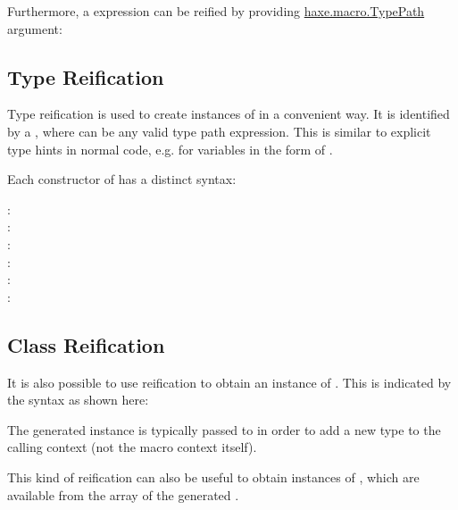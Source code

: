 Furthermore, a  expression can be reified by providing \href{http://api.haxe.org/haxe/macro/TypePath.html}{haxe.macro.TypePath} argument: 

\subsection{Type Reification}
\label{macro-reification-type}

Type reification is used to create instances of  in a convenient way. It is identified by a , where  can be any valid type path expression. This is similar to explicit type hints in normal code, e.g. for variables in the form of .

Each constructor of  has a distinct syntax:

\begin{description}
	\item[:] 
	\item[:] 
	\item[:] 
	\item[:] 
	\item[:] 
	\item[:] 
\end{description}

\subsection{Class Reification}
\label{macro-reification-class}

It is also possible to use reification to obtain an instance of . This is indicated by the  syntax as shown here:


The generated  instance is typically passed to  in order to add a new type to the calling context (not the macro context itself).

This kind of reification can also be useful to obtain instances of , which are available from the  array of the generated . 

